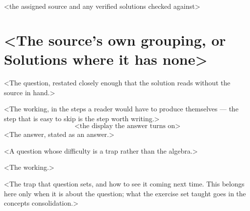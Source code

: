 \documentclass[a4paper,10pt]{article}
\begin{document}
%
  {<the assigned source and any verified solutions checked against>}

\section{<The source's own grouping, or Solutions where it has none>}

\begin{question}
<The question, restated closely enough that the solution reads without the source in hand.>
\end{question}

\begin{solution}
<The working, in the steps a reader would have to produce themselves --- the step that is easy to
skip is the step worth writing.>
\[
  \text{<the display the answer turns on>}
\]
<The answer, stated as an answer.>
\end{solution}

\begin{question}
<A question whose difficulty is a trap rather than the algebra.>
\end{question}

\begin{solution}
<The working.>
\end{solution}

\begin{warning}
<The trap that question sets, and how to see it coming next time. This belongs here only when it
is about the question; what the exercise set taught goes in the concepts consolidation.>
\end{warning}
\end{document}

